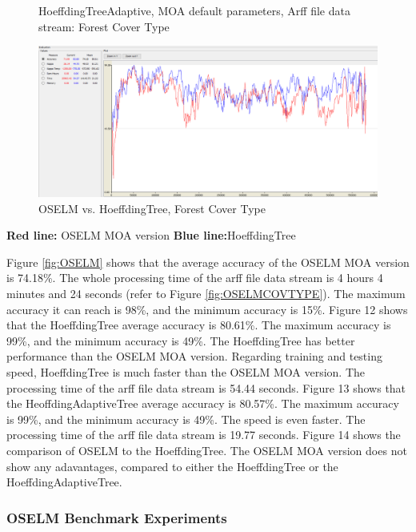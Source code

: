 \documentclass[a4paper, 14pt]{extarticle}
\begin{document}
\begin{landscape}
\begin{figure}[H]
\caption{\label{fig:HeoffdingTreeAdaptive}HoeffdingTreeAdaptive, MOA default parameters, Arff file data stream: Forest Cover Type}
\end{figure}
 \begin{figure}[H]
\centering
\includegraphics[width=1.35\textwidth]{10.png}
\caption{\label{fig:OSELMvsHOEFFDINGTREE}OSELM vs. HoeffdingTree, Forest Cover Type}
\end{figure}
\textbf{Red line:} OSELM MOA version  \textbf{Blue line:}HoeffdingTree
\end{landscape}
\par Figure \ref{fig:OSELM} shows that the average accuracy of the OSELM MOA version is 74.18\%. The whole processing time of the arff file data stream is 4 hours 4 minutes and 24 seconds (refer to Figure \ref{fig:OSELMCOVTYPE}). The maximum accuracy it can reach is 98\%, and the minimum accuracy is 15\%. Figure 12 shows that the HoeffdingTree average accuracy is 80.61\%. The maximum accuracy is 99\%, and the minimum accuracy is 49\%. The HoeffdingTree has better performance than the OSELM MOA version. Regarding training and testing speed, HoeffdingTree is much faster than the OSELM MOA version. The processing time of the arff file data stream is 54.44 seconds. Figure 13 shows that the HeoffdingAdaptiveTree average accuracy is 80.57\%. The maximum accuracy is 99\%, and the minimum accuracy is 49\%. The speed is even faster. The processing time of the arff file data stream is 19.77 seconds. Figure 14 shows the comparison of OSELM to the HoeffdingTree. The OSELM MOA version does not show any adavantages, compared to either the HoeffdingTree or the HoeffdingAdaptiveTree.   
\subsubsection{OSELM Benchmark Experiments}
\end{document}
